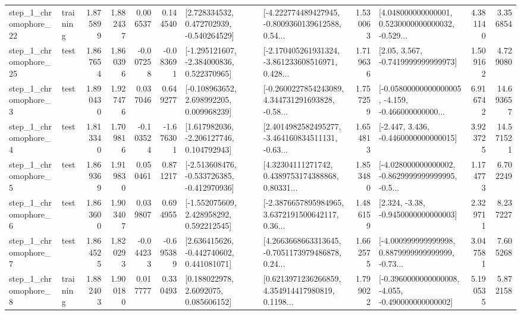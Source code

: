 \begin{tabular}{llrrrrllrlrr}
    step\_1\_chromophore\_22 &  training &      1.875899 &    1.882437 &      0.006537 &  0.144540 &    [2.728334532, 0.472702939, -0.540264529] &  [-4.222774489427945, -0.8009360139612588, 0.54... &       1.530063 &  [4.048000000000001, 0.5230000000000032, -0.529... &            4.381140 &          3.356854 \\
    step\_1\_chromophore\_25 &      test &      1.867654 &    1.860396 &     -0.007258 & -0.083691 &   [-1.295121607, -2.384000836, 0.522370965] &  [-2.170405261931324, -3.861233608516971, 0.428... &       1.719636 &                 [2.05, 3.567, -0.7419999999999973] &            1.509162 &          4.729080 \\
     step\_1\_chromophore\_3 &      test &      1.890430 &    1.927476 &      0.037046 &  0.649277 &    [-0.108963652, 2.698992205, 0.009968239] &  [-0.2600227854243089, 4.344731291693828, -0.58... &       1.757259 &  [-0.05800000000000005, -4.159, -0.466000000000... &            6.916742 &         14.693657 \\
     step\_1\_chromophore\_4 &      test &      1.813340 &    1.709816 &     -0.103524 & -1.676301 &    [1.617982036, -2.206127746, 0.104792943] &  [2.4014982582495277, -3.464160834511131, -0.63... &       1.654813 &               [-2.447, 3.436, -0.4460000000000015] &            3.923725 &         14.571521 \\
     step\_1\_chromophore\_5 &      test &      1.869369 &    1.919830 &      0.050461 &  0.871217 &  [-2.513608476, -0.533726385, -0.412970936] &  [4.32304111271742, 0.4389753174388868, 0.80331... &       1.853480 &  [-4.028000000000002, -0.8629999999999995, -0.5... &            1.174773 &          6.702249 \\
     step\_1\_chromophore\_6 &      test &      1.863600 &    1.903407 &      0.039807 &  0.694955 &    [-1.552075609, 2.428958292, 0.592212545] &  [-2.3876657895984965, 3.6372191500642117, 0.36... &       1.486159 &                [2.324, -3.38, -0.9450000000000003] &            2.329711 &          8.237227 \\
     step\_1\_chromophore\_7 &      test &      1.864525 &    1.820293 &     -0.044233 & -0.695389 &    [2.636415626, -0.442740602, 0.441081071] &  [4.2663668663313645, -0.7051173979486878, 0.24... &       1.662575 &  [-4.000999999999998, 0.8879999999999999, -0.73... &            3.047581 &          7.605268 \\
     step\_1\_chromophore\_8 &  training &      1.882403 &    1.900180 &      0.017777 &  0.330493 &       [0.188022978, 2.6092075, 0.085606152] &  [0.6213971236266859, 4.354914417980819, 0.1198... &       1.799022 &  [-0.3960000000000008, -4.055, -0.490000000000002] &            5.190535 &          5.872158 \\

\end{tabular}
